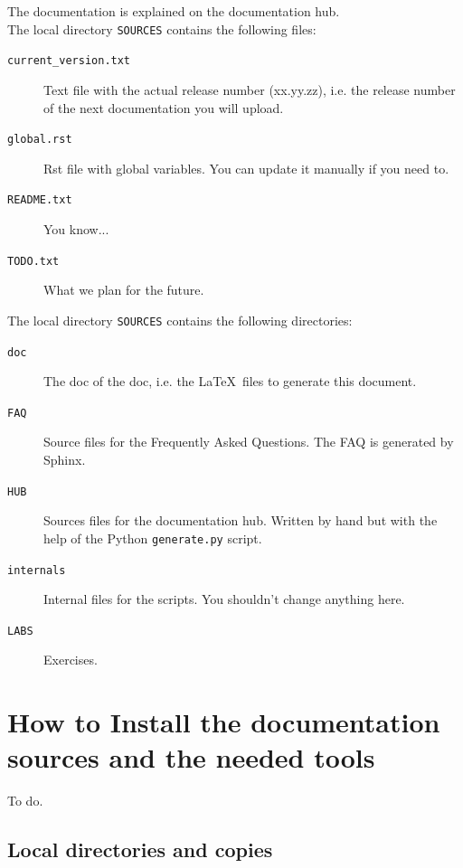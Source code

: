 \documentclass[a4paper,10pt]{article}
\newcommand{\code}[1]{\texttt{#1}}
\begin{document}
The documentation is explained on the documentation hub.\\

The local directory \code{SOURCES} contains the following files:

\begin{description}
 \item[\code{current\_version.txt}] Text file with the actual release number (xx.yy.zz), i.e. the release number of the next documentation you will upload.
 \item[\code{global.rst}] Rst file with global variables. You can update it manually if you need to.
 \item[\code{README.txt}] You know...
 \item[\code{TODO.txt}] What we plan for the future.
\end{description}

The local directory \code{SOURCES} contains the following directories:

\begin{description}
 \item[\code{doc}] The doc of the doc, i.e. the \LaTeX\ files to generate this document.
 \item[\code{FAQ}] Source files for the Frequently Asked Questions. The FAQ is generated by Sphinx.
 \item[\code{HUB}] Sources files for the documentation hub. Written by hand but with the help of the Python \code{generate.py} script.
 \item[\code{internals}] Internal files for the scripts. You shouldn't change anything here.
 \item[\code{LABS}] Exercises. 
\end{description}



\section{How to Install the documentation sources and the needed tools}
\label{installation}

To do.

\subsection{Local directories and copies}
\end{document}
